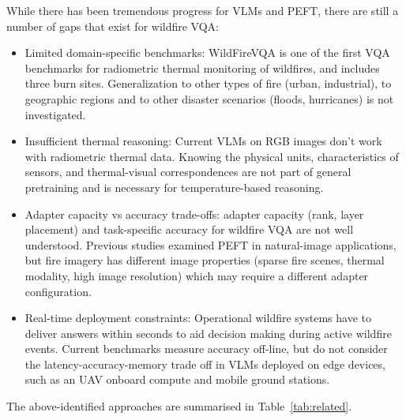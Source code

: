 \documentclass[conference]{IEEEtran}
\begin{document}
While there has been tremendous progress for VLMs and PEFT, there are still a number of gaps that exist for wildfire VQA:
\begin{itemize}[leftmargin=*, itemsep=1pt, topsep=2pt, parsep=0pt]
    \item {Limited domain-specific benchmarks:} WildFireVQA is one of the first VQA benchmarks for radiometric thermal monitoring of wildfires, and includes three burn sites. Generalization to other types of fire (urban, industrial), to geographic regions and to other disaster scenarios (floods, hurricanes) is not investigated.
    \item {Insufficient thermal reasoning:} Current VLMs on RGB images don't work with radiometric thermal data. Knowing the physical units, characteristics of sensors, and thermal-visual correspondences are not part of general pretraining and is necessary for temperature-based reasoning.
    \item {Adapter capacity vs accuracy trade-offs:} adapter capacity (rank, layer placement) and task-specific accuracy for wildfire VQA are not well understood. Previous studies examined PEFT in natural-image applications, but fire imagery has different image properties (sparse fire scenes, thermal modality, high image resolution) which may require a different adapter configuration.
    \item {Real-time deployment constraints:} Operational wildfire systems have to deliver answers within seconds to aid decision making during active wildfire events. Current benchmarks measure accuracy off-line, but do not consider the latency-accuracy-memory trade off in VLMs deployed on edge devices, such as an UAV onboard compute and mobile ground stations.
\end{itemize}
The above-identified approaches are summarised in Table~\ref{tab:related}.
\end{document}
